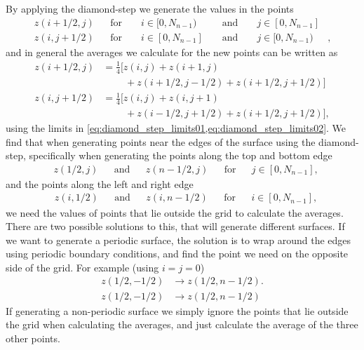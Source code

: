 By applying the diamond-step we generate the values in the points
\begin{align}
    z(i+1/2, j) & &\text{for } & &i\in [0,N_{n-1}) & &\text{ and } & &j\in [0,N_{n-1}]& \label{eq:diamond_step_limits01} \\
    z(i, j+1/2) & &\text{for } & &i\in [0,N_{n-1}] & &\text{ and } & &j\in [0,N_{n-1})&, \label{eq:diamond_step_limits02}
\end{align}
and in general the averages we calculate for the new points can be written as
\begin{align}
    z(i+1/2, j) 
    &= 
    \frac{1}{4}\Big[
        z(i, j) + z(i+1, j) \nonumber\\
        &\phantom{=\Big[}~~~%
            + z(i+1/2, j-1/2) + z(i+1/2, j+1/2)
    \Big]
    \label{eq:diamond_step01}\\
    z(i, j+1/2) 
    &= 
    \frac{1}{4}\Big[
        z(i,j) + z(i, j+1) \nonumber\\
        &\phantom{=\Big[}~~~%
            + z(i-1/2, j+1/2) + z(i+1/2, j+1/2)
    \Big],
    \label{eq:diamond_step02}
\end{align}
using the limits in \cref{eq:diamond_step_limits01,eq:diamond_step_limits02}. We find that when generating points near the edges of the surface using the diamond-step, specifically when generating the points along the top and bottom edge%
%
\begin{align*} %
    &z(1/2, j) & &\text{and} & &z(n - 1/2, j) & &\text{for} & &j \in [0, N_{n-1}],
\end{align*}
and the points along the left and right edge
\begin{align*}
    &z(i, 1/2) & &\text{and} & &z(i, n - 1/2) & &\text{for} & &i \in [0, N_{n-1}],
\end{align*}
we need the values of points that lie outside the grid to calculate the averages. There are two possible solutions to this, that will generate different surfaces. If  we want to generate a periodic surface, the solution is to wrap around the edges using periodic boundary conditions, and find the point we need on the opposite side of the grid. For example (using $i = j = 0$)
\begin{align*}
    z(1/2, -1/2) &\rightarrow z(1/2, n-1/2). \\
    z(1/2, -1/2) &\rightarrow z(1/2, n-1/2)
\end{align*}
If generating a non-periodic surface we simply ignore the points that lie outside the grid when calculating the averages, and just calculate the average of the three other points.

